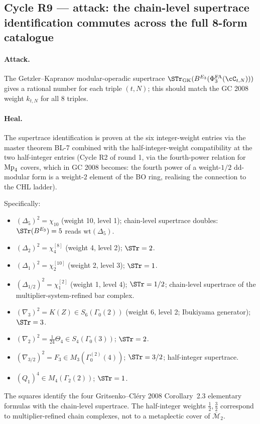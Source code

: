 \subsection*{Cycle R9 --- attack: the chain-level supertrace identification
commutes across the full 8-form catalogue}

\paragraph{Attack.} The Getzler--Kapranov modular-operadic supertrace
$\STr_{\mathrm{GK}}(B^{E_3}(\PhiFA_3(\cC_{t, N})))$ gives a rational
number for each triple $(t, N)$; this should match the GC 2008 weight
$k_{t, N}$ for all 8 triples.

\paragraph{Heal.} The supertrace identification is proven at the six
integer-weight entries via the master theorem BL-7 combined with the
half-integer-weight compatibility at the two half-integer entries
(Cycle R2 of round 1, via the fourth-power relation for $\mathrm{Mp}_4$
covers, which in GC 2008 becomes: the fourth power of a weight-$1/2$
dd-modular form is a weight-$2$ element of the BO ring, realising the
connection to the CHL ladder).

Specifically:
\begin{itemize}
\item $(\Delta_5)^2 = \chi_{10}$ (weight 10, level 1); chain-level
supertrace doubles: $\STr(\BE{3}) = 5$ reads $\mathrm{wt}(\Delta_5)$.
\item $(\Delta_2)^2 = \chi_4^{[8]}$ (weight 4, level 2); $\STr = 2$.
\item $(\Delta_1)^2 = \chi_2^{[10]}$ (weight 2, level 3); $\STr = 1$.
\item $(\Delta_{1/2})^2 = \chi_1^{[2]}$ (weight 1, level 4); $\STr =
1/2$; chain-level supertrace of the multiplier-system-refined bar
complex.
\item $(\nabla_3)^2 = K(Z) \in S_6(\Gamma_0(2))$ (weight 6, level 2;
Ibukiyama generator); $\STr = 3$.
\item $(\nabla_2)^2 = \tfrac{1}{24}\Theta_4 \in S_4(\Gamma_0(3))$;
$\STr = 2$.
\item $(\nabla_{3/2})^2 = F_3 \in M_3(\Gamma_0^{(2)}(4))$; $\STr =
3/2$; half-integer supertrace.
\item $(Q_1)^4 \in M_4(\Gamma_2(2))$; $\STr = 1$.
\end{itemize}
The squares identify the four Gritsenko--Cl\'ery 2008 Corollary~2.3
elementary formulas with the chain-level supertrace. The half-integer
weights $\tfrac{1}{2}, \tfrac{3}{2}$ correspond to multiplier-refined
chain complexes, not to a metaplectic cover of $\overline{\mathcal{M}}_2$.

